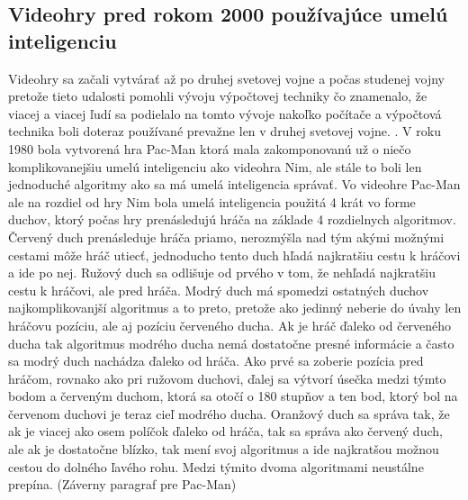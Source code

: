 \documentclass[10pt,twoside,slovak,a4paper]{article}
\begin{document}
\subsection{Videohry pred rokom 2000 používajúce umelú inteligenciu} \label{kapitola2.2}
Videohry sa začali vytvárať až po druhej svetovej vojne a počas studenej vojny pretože tieto udalosti pomohli vývoju výpočtovej techniky čo znamenalo, že viacej a viacej ľudí sa podielalo na tomto vývoje nakoľko počítače a výpočtová technika boli doteraz používané prevažne len v druhej svetovej vojne. . V roku 1980 bola vytvorená hra Pac-Man ktorá mala zakomponovanú už o niečo komplikovanejšiu umelú inteligenciu ako videohra Nim, ale stále to boli len jednoduché algoritmy ako sa má umelá inteligencia správať. Vo videohre Pac-Man ale na rozdiel od hry Nim bola umelá inteligencia použitá 4 krát vo forme duchov, ktorý počas hry prenásledujú hráča na základe 4 rozdielnych algoritmov.
Červený duch prenásleduje hráča priamo, nerozmýšla nad tým akými možnými cestami môže hráč utiecť, jednoducho tento duch hľadá najkratšiu cestu k hráčovi a ide po nej.
Ružový duch sa odlišuje od prvého v tom, že nehľadá najkratšiu cestu k hráčovi, ale pred hráča.
Modrý duch má spomedzi ostatných duchov najkomplikovanjší algoritmus a to preto, pretože ako jedinný neberie do úvahy len hráčovu pozíciu, ale aj pozíciu červeného ducha. Ak je hráč ďaleko od červeného ducha tak algoritmus modrého ducha nemá dostatočne presné informácie a často sa modrý duch nachádza ďaleko od hráča. Ako prvé sa zoberie pozícia pred hráčom, rovnako ako pri ružovom duchovi, ďalej sa výtvorí úsečka medzi týmto bodom a červeným duchom, ktorá sa otočí o 180 stupňov a ten bod, ktorý bol na červenom duchovi je teraz cieľ modrého ducha.
Oranžový duch sa správa tak, že ak je viacej ako osem políčok ďaleko od hráča, tak sa správa ako červený duch, ale ak je dostatočne blízko, tak mení svoj algoritmus a ide najkratšou možnou cestou do dolného ľavého rohu. Medzi týmito dvoma algoritmami neustálne prepína.
(Záverny paragraf pre Pac-Man)
\end{document}
